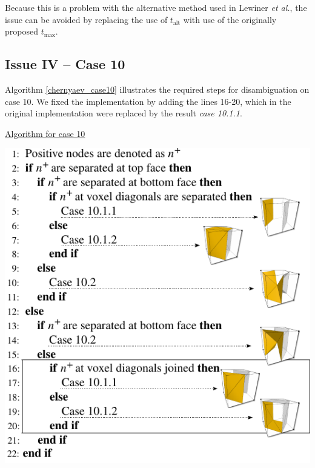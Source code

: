 Because this is a problem with the alternative method used in Lewiner \emph{et al.}, the issue can be avoided by replacing the use of $t_{\mathrm{alt}}$ with use of the originally proposed $t_{\mathrm{max}}$.

\subsection{Issue IV -- Case 10}

Algorithm \ref{chernyaev_case10} illustrates the required steps for disambiguation on case 10. We fixed the \mc{} implementation by adding the lines 16-20, which in the original implementation were replaced by the result \textit{case 10.1.1}. 



\begin{algorithm}
\caption{\href{http://liscustodio.github.io/C_MC33/alg2.html}{Algorithm for case 10} \cite{lisOnline2013}}
\label{chernyaev_case10}
\includegraphics[width=0.7\linewidth]{chapter4/figures/algorithm.pdf}
\end{algorithm}



